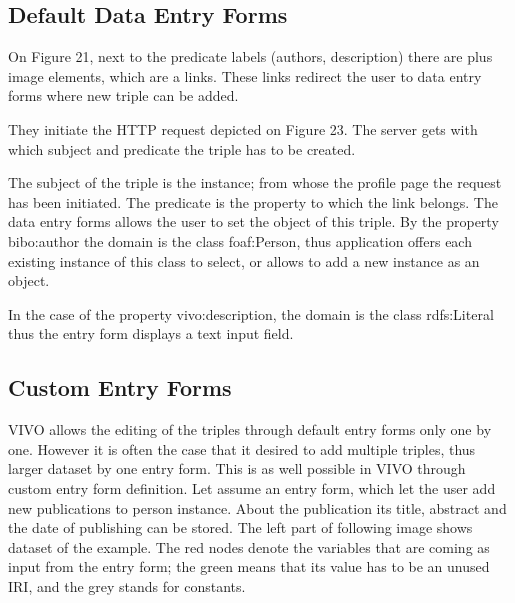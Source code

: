 
\subsection{Default Data Entry Forms}

On Figure 21, next to the predicate labels (authors, description) there are plus image elements, which are a links. These links redirect the user to data entry forms where new triple can be added. 


They initiate the HTTP request depicted on Figure 23. The server gets with which subject and predicate the triple has to be created.

The subject of the triple is the instance; from whose the profile page the request has been initiated. The predicate is the property to which the link belongs. The data entry forms allows the user to set the object of this triple. By the property bibo:author the domain is the class foaf:Person, thus application offers each existing instance of this class to select, or allows to add a new instance as an object. 


In the case of the property vivo:description, the domain is the class rdfs:Literal thus the entry form displays a text input field.



\subsection{Custom Entry Forms}

VIVO allows the editing of the triples through default entry forms only one by one. However it is often the case that it desired to add multiple triples, thus larger dataset by one entry form. This is as well possible in VIVO through custom entry form definition.
Let assume an entry form, which let the user add new publications to person instance. About the publication its title, abstract and the date of publishing can be stored. The left part of following image shows dataset of the example. The red nodes denote the variables that are coming as input from the entry form; the green means that its value has to be an unused IRI, and the grey stands for constants. 

